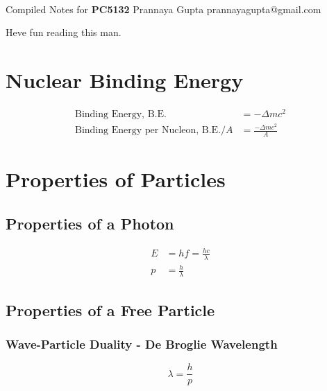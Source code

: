 \documentclass[11pt]{article}
\begin{document}
\thispagestyle{empty}
\bigskip \
\vspace{0.1cm}

\begin{center}
{\fontsize{22}{22} \selectfont Compiled Notes for}
\vskip 16pt
{\fontsize{36}{36} \selectfont \bf \sffamily PC5132}
\vskip 24pt
{\fontsize{18}{18} \selectfont \rmfamily Prannaya Gupta} 
\vskip 6pt
{\fontsize{14}{14} \selectfont \ttfamily prannayagupta@gmail.com} 
\vskip 24pt
\end{center}

{\parindent0pt \baselineskip=15.5pt Heve fun reading this man.}

\newpage
\microtoc
\newpage

\section{Nuclear Binding Energy}
\begin{align*}
    \text{Binding Energy, B.E.} &= -\Delta mc^2 \\
    \text{Binding Energy per Nucleon, B.E.}/A &= \frac{-\Delta mc^2}{A}
\end{align*}





\section{Properties of Particles}

\subsection{Properties of a Photon}
\begin{align*}
    E &= hf = \frac{hc}\lambda \\
    p &= \frac{h}\lambda
\end{align*}

\subsection{Properties of a Free Particle}

\subsubsection{Wave-Particle Duality - De Broglie Wavelength}

$$\lambda = \frac{h}p$$
\end{document}

